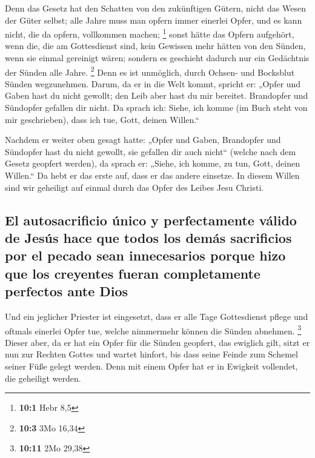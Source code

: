  Denn das Gesetz hat den Schatten von den zukünftigen
Gütern, nicht das Wesen der Güter selbst; alle Jahre muss man opfern
immer einerlei Opfer, und es kann nicht, die da opfern, vollkommen
machen; \footnote{\textbf{10:1} Hebr 8,5}  sonst hätte das
Opfern aufgehört, wenn die, die am Gottesdienst sind, kein Gewissen mehr
hätten von den Sünden, wenn sie einmal gereinigt wären; 
sondern es geschieht dadurch nur ein Gedächtnis der Sünden alle Jahre.
\footnote{\textbf{10:3} 3Mo 16,34}  Denn es ist unmöglich,
durch Ochsen- und Bocksblut Sünden wegzunehmen.  Darum, da
er in die Welt kommt, spricht er: „Opfer und Gaben hast du nicht
gewollt; den Leib aber hast du mir bereitet.  Brandopfer
und Sündopfer gefallen dir nicht.  Da sprach ich: Siehe,
ich komme (im Buch steht von mir geschrieben), dass ich tue, Gott,
deinen Willen.``

 Nachdem er weiter oben gesagt hatte: „Opfer und Gaben,
Brandopfer und Sündopfer hast du nicht gewollt, sie gefallen dir auch
nicht`` (welche nach dem Gesetz geopfert werden),  da
sprach er: „Siehe, ich komme, zu tun, Gott, deinen Willen.`` Da hebt er
das erste auf, dass er das andere einsetze.  In diesem
Willen sind wir geheiligt auf einmal durch das Opfer des Leibes Jesu
Christi.

\hypertarget{el-autosacrificio-uxfanico-y-perfectamente-vuxe1lido-de-jesuxfas-hace-que-todos-los-demuxe1s-sacrificios-por-el-pecado-sean-innecesarios-porque-hizo-que-los-creyentes-fueran-completamente-perfectos-ante-dios}{%
\subsection{El autosacrificio único y perfectamente válido de Jesús hace
que todos los demás sacrificios por el pecado sean innecesarios porque
hizo que los creyentes fueran completamente perfectos ante
Dios}\label{el-autosacrificio-uxfanico-y-perfectamente-vuxe1lido-de-jesuxfas-hace-que-todos-los-demuxe1s-sacrificios-por-el-pecado-sean-innecesarios-porque-hizo-que-los-creyentes-fueran-completamente-perfectos-ante-dios}}

 Und ein jeglicher Priester ist eingesetzt, dass er alle
Tage Gottesdienst pflege und oftmals einerlei Opfer tue, welche
nimmermehr können die Sünden abnehmen. \footnote{\textbf{10:11} 2Mo
  29,38}  Dieser aber, da er hat ein Opfer für die Sünden
geopfert, das ewiglich gilt, sitzt er nun zur Rechten Gottes
 und wartet hinfort, bis dass seine Feinde zum Schemel
seiner Füße gelegt werden.  Denn mit einem Opfer hat er
in Ewigkeit vollendet, die geheiligt werden.

